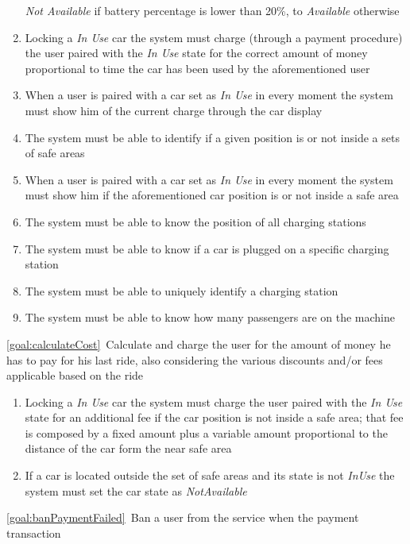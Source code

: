 \begin{description}
\begin{enumerate}[resume*]
  				\textit{Not Available} if battery percentage is lower than 20\%, to \textit{Available}
  				otherwise
  				\item Locking a \textit{In Use} car the system must charge (through a payment
  				procedure) the user paired with the \textit{In Use} state for the correct amount of money
  				proportional to time the car has been used by the aforementioned user
  				\item When a user is paired with a car set as \textit{In Use} in every moment the system
  				must show him of the current charge through the car display 
  				\item The system must be able to identify if a given position is or not inside a sets of safe
  				areas
  				\item When a user is paired with a car set as \textit{In Use} in every moment the system
  				must show him if the aforementioned car position is or not inside a safe area
  				\item The system must be able to know the position of all charging stations
  				\item The system must be able to know if a car is plugged on a specific charging station
  				\item The system must be able to uniquely identify a charging station
  				\item The system must be able to know how many passengers are on the machine	
   			\end{enumerate}
  		\item \ref{goal:calculateCost}\ Calculate and charge the user for the amount of money he has
  		to pay for his last ride, also considering the various discounts and/or fees applicable based on
  		the ride
  			\begin{enumerate}[resume*]
  				\item Locking a \textit{In Use} car the system must charge the user paired with the
  				\textit{In Use} state for an additional fee if the car position is not inside a safe area; that
  				fee is composed by a fixed amount plus a variable amount proportional to the distance of
  				the car form the near safe area
  				\item If a car is located outside the set of safe areas and its state is not \textit{InUse} the
  				system must set the car state as \textit{NotAvailable}
   			\end{enumerate}
   		\item \ref{goal:banPaymentFailed}\ Ban a user from the service when the payment transaction

\end{description}
